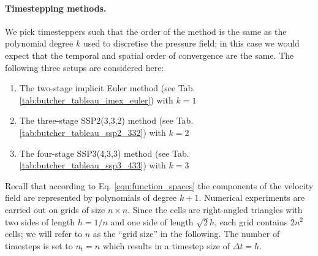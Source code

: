 \documentclass[11pt]{article}
\begin{document}
\paragraph{Timestepping methods.}
We pick timesteppers such that the order of the method is the same as the polynomial degree $k$ used to discretise the pressure field; in this case we would expect that the temporal and spatial order of convergence are the same. The following three setups are considered here:
\begin{enumerate}
    \item The two-stage implicit Euler method (see Tab. \ref{tab:butcher_tableau_imex_euler}) with $k=1$
    \item The three-stage SSP2(3,3,2) method (see Tab. \ref{tab:butcher_tableau_ssp2_332}) with $k=2$
    \item The four-stage SSP3(4,3,3) method (see Tab. \ref{tab:butcher_tableau_ssp3_433}) with $k=3$
\end{enumerate}
Recall that according to Eq. \eqref{eqn:function_spaces} the components of the velocity field are represented by polynomials of degree $k+1$. Numerical experiments are carried out on grids of size $n\times n$. Since the cells are right-angled triangles with two sides of length $h=1/n$ and one side of length $\sqrt{2}h$, each grid contains $2n^2$ cells; we will refer to $n$ as the ``grid size'' in the following. The number of timesteps is set to $n_t=n$ which results in a timestep size of $\Delta t=h$.
\end{document}
